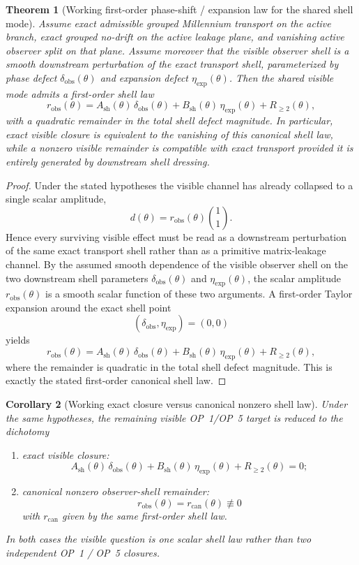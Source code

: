 \documentclass[12pt,a4paper]{article}
\newtheorem{theorem}{Theorem}[section]
\newtheorem{corollary}[theorem]{Corollary}
\begin{document}
\begin{theorem}[Working first-order phase-shift / expansion law for the shared shell mode]
Assume exact admissible grouped Millennium transport on the active branch, exact grouped no-drift on the active leakage plane, and vanishing active observer split on that plane. Assume moreover that the visible observer shell is a smooth downstream perturbation of the exact transport shell, parameterized by phase defect $\delta_{\mathrm{obs}}(\theta)$ and expansion defect $\eta_{\mathrm{exp}}(\theta)$. Then the shared visible mode admits a first-order shell law
\[
 r_{\mathrm{obs}}(\theta)
 =A_{\mathrm{sh}}(\theta)\,\delta_{\mathrm{obs}}(\theta)
 +B_{\mathrm{sh}}(\theta)\,\eta_{\mathrm{exp}}(\theta)
 +R_{\ge 2}(\theta),
\]
with a quadratic remainder in the total shell defect magnitude. In particular, exact visible closure is equivalent to the vanishing of this canonical shell law, while a nonzero visible remainder is compatible with exact transport provided it is entirely generated by downstream shell dressing.
\end{theorem}

\begin{proof}
Under the stated hypotheses the visible channel has already collapsed to a single scalar amplitude,
\[
 d(\theta)=r_{\mathrm{obs}}(\theta)\binom{1}{1}.
\]
Hence every surviving visible effect must be read as a downstream perturbation of the same exact transport shell rather than as a primitive matrix-leakage channel. By the assumed smooth dependence of the visible observer shell on the two downstream shell parameters $\delta_{\mathrm{obs}}(\theta)$ and $\eta_{\mathrm{exp}}(\theta)$, the scalar amplitude $r_{\mathrm{obs}}(\theta)$ is a smooth scalar function of these two arguments. A first-order Taylor expansion around the exact shell point
\[
 (\delta_{\mathrm{obs}},\eta_{\mathrm{exp}})=(0,0)
\]
yields
\[
 r_{\mathrm{obs}}(\theta)
 =A_{\mathrm{sh}}(\theta)\,\delta_{\mathrm{obs}}(\theta)
 +B_{\mathrm{sh}}(\theta)\,\eta_{\mathrm{exp}}(\theta)
 +R_{\ge 2}(\theta),
\]
where the remainder is quadratic in the total shell defect magnitude. This is exactly the stated first-order canonical shell law.
\end{proof}

\begin{corollary}[Working exact closure versus canonical nonzero shell law]
Under the same hypotheses, the remaining visible OP~1/OP~5 target is reduced to the dichotomy
\begin{enumerate}[leftmargin=2em,label=(\roman*)]
\item exact visible closure:
\[
 A_{\mathrm{sh}}(\theta)\,\delta_{\mathrm{obs}}(\theta)
 +B_{\mathrm{sh}}(\theta)\,\eta_{\mathrm{exp}}(\theta)
 +R_{\ge 2}(\theta)=0;
\]
\item canonical nonzero observer-shell remainder:
\[
 r_{\mathrm{obs}}(\theta)=r_{\mathrm{can}}(\theta)
 \not\equiv 0
\]
with $r_{\mathrm{can}}$ given by the same first-order shell law.
\end{enumerate}
In both cases the visible question is one scalar shell law rather than two independent OP~1 / OP~5 closures.
\end{corollary}
\end{document}
